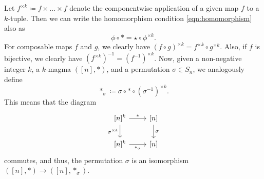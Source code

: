 \documentclass[12pt]{article}
\theoremstyle{definition}
\theoremstyle{remark}
\begin{document}
	Let $f^{\times k} \coloneqq f \times \dots \times f$ denote the componentwise application of a given map $f$ to a $k$-tuple. Then we can write the homomorphism condition \eqref{eqn:homomorphism} also as
	\[
	\phi\circ\ast = \star\circ\phi^{\times k}.
	\]
	For composable maps $f$ and $g$, we clearly have $(f\circ g)^{\times k} = f^{\times k}\circ g^{\times k}$. Also, if $f$ is bijective, we clearly have $(f^{\times k})^{-1} = (f^{-1})^{\times k}$. Now, given a non-negative integer $k$, a $k$-magma $([n],\ast)$, and a permutation $\sigma \in S_n$, we analogously define
	\[
	\ast_{\sigma} \coloneqq \sigma\circ\ast\circ(\sigma^{-1})^{\times k}.
	\]
	This means that the diagram
	\begin{equation*}
		\begin{tikzcd}
			{[n]^k} & {[n]} \\
			{[n]^k} & {[n]}
			\arrow["\ast", from=1-1, to=1-2]
			\arrow["{\sigma^{\times k}}"', from=1-1, to=2-1]
			\arrow["\sigma", from=1-2, to=2-2]
			\arrow["{\ast_{\sigma}}"', from=2-1, to=2-2]
		\end{tikzcd}
	\end{equation*}
	commutes, and thus, the permutation $\sigma$ is an isomorphism $([n],\ast) \to ([n],\ast_{\sigma})$.
	
\end{document}
